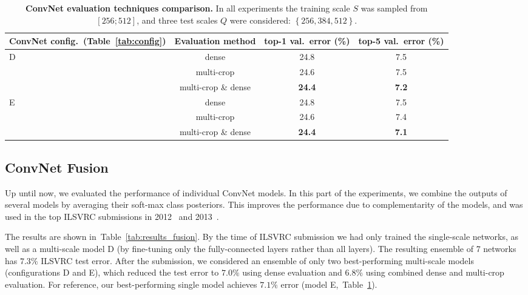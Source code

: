 \documentclass{article} %
\newcommand{\tblref}[1]{Table~\ref{#1}}
\begin{document}
\begin{table}[htb]
\small
\centering
\caption{\textbf{ConvNet evaluation techniques comparison.}
In all experiments the training scale $S$ was sampled from $\left[256;512\right]$, and three test scales $Q$ were considered: $\left\{256,384,512\right\}$.
}
\begin{tabular}{|l|c|c|c|} \hline
ConvNet config.\ (\tblref{tab:config}) & Evaluation method & top-1 val.\ error (\%) & top-5 val.\ error (\%) \\ \hline
\multirow{3}{*}{D} & dense & 24.8  & 7.5  \\ \cline{2-4}
& multi-crop & 24.6 & 7.5  \\ \cline{2-4}
& multi-crop \& dense & \textbf{24.4}  & \textbf{7.2}  \\ \hline 
\multirow{3}{*}{E} & dense & 24.8  & 7.5  \\ \cline{2-4}
& multi-crop & 24.6 & 7.4  \\ \cline{2-4}
& multi-crop \& dense & \textbf{24.4}  & \textbf{7.1}  \\ \hline 
\end{tabular}
\label{tab:results_multi_crop}
\end{table}

\subsection{ConvNet Fusion}
\label{sec:fusion}
Up until now, we evaluated the performance of individual ConvNet models.
In this part of the experiments, we combine the outputs of several models by averaging their soft-max class posteriors.
This improves the performance due to complementarity of the models, and was used in the top ILSVRC submissions in 2012~\citep{Krizhevsky12} and 2013~\citep{Zeiler13,Sermanet14}.

The results are shown in~\tblref{tab:results_fusion}.
By the time of ILSVRC submission we had only trained the single-scale networks, as well as a multi-scale model D (by fine-tuning only the fully-connected layers rather than all layers). The resulting ensemble of 7 networks has $7.3\%$ ILSVRC test error.
After the submission, we considered an ensemble of only two best-performing multi-scale models (configurations D and E), which reduced the test error to 
$7.0\%$ using dense evaluation and $6.8\%$ using combined dense and multi-crop evaluation.
For reference, our best-performing single model achieves $7.1\%$ error (model E,~\tblref{tab:results_multi_crop}).
\end{document}
